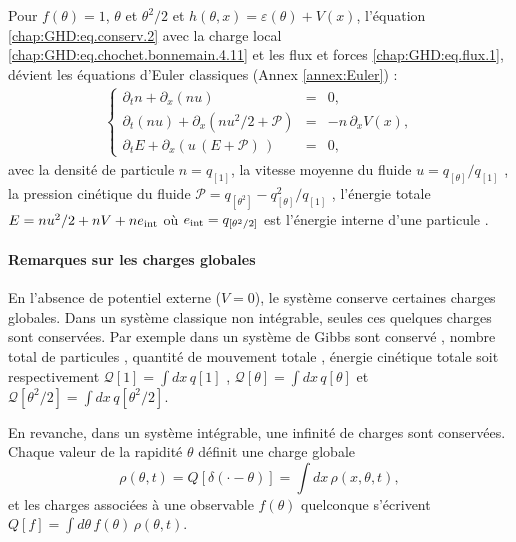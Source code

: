 Pour $f(\theta) = 1$, $\theta$ et $\theta^2/2$ et $h(\theta,x)=\varepsilon(\theta)+V(x)$, l'équation \eqref{chap:GHD:eq.conserv.2} avec la charge local \eqref{chap:GHD:eq.chochet.bonnemain.4.11} et les flux et forces \eqref{chap:GHD:eq.flux.1}, dévient les équations d’Euler classiques (Annex \ref{annex:Euler}) :
\begin{eqnarray}\label{chap:3:eq:hydro.1}
	\left\{
	\begin{array}{rcl}
	\partial_t n + \partial_x (n u) &=& 0, \\
	\partial_t (n u) + \partial_x (n u^2/2 + \mathcal{P}) &=& -n \, \partial_x V(x), \\
	\partial_t E + \partial_x (u\,(E+\mathcal{P})\,) &=& 0,
	\end{array}
	\right .  
\end{eqnarray}
avec la densité de particule $n = q_{[1]}$, la vitesse moyenne du fluide $u = {q_{[\theta]}}/{q_{[1]}}$ , la pression cinétique du fluide $\mathcal{P} =  q_{[\theta^2]} - {q_{[\theta]}^2}/{q_{[1]}} $ , l'énergie totale $E = nu^2/2 + nV + ne_{\rm int}$ où $e_{\rm int} = q_{[\theta^2/2]}$ est l'énergie interne d'une particule .



\paragraph{Remarques sur les charges globales}
En l’absence de potentiel externe ($V = 0$), le système conserve certaines charges globales. Dans un système classique non intégrable, seules ces quelques charges sont conservées. Par exemple dans un système de Gibbs sont conservé , nombre total de particules , quantité de mouvement totale , énergie cinétique totale soit respectivement $\mathcal{Q}[1]  =  \int dx \, q[1]$ , $\mathcal{Q}[\theta] = \int dx \, q[\theta]$ et $\mathcal{Q}[{\theta^2}/{2}] = \int dx \, q\left[{\theta^2}/{2}\right] $. 


\medskip

En revanche, dans un système intégrable, une infinité de charges sont conservées. Chaque valeur de la rapidité \(\theta\) définit une charge globale
\begin{equation*}
\rho(\theta,t) = Q[\delta(\cdot - \theta)] = \int dx \, \rho(x,\theta,t),
\end{equation*}
et les charges associées à une observable \(f(\theta)\) quelconque s’écrivent
\(
Q[f] = \int d\theta \, f(\theta) \, \rho(\theta,t).
\)

\medskip


